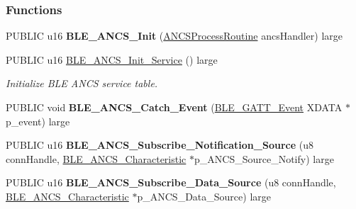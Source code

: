\subsubsection*{Functions}
\begin{DoxyCompactItemize}
\item 
P\+U\+B\+L\+IC u16 {\bfseries B\+L\+E\+\_\+\+A\+N\+C\+S\+\_\+\+Init} (\hyperlink{group___b_l_e___a_n_c_s_ga191b977bd0c8b7328a6a1c5ef65c76b2}{A\+N\+C\+S\+Process\+Routine} ancs\+Handler) large\hypertarget{group___b_l_e___a_n_c_s_ga33798ac497e1eac00ca6003700363918}{}\label{group___b_l_e___a_n_c_s_ga33798ac497e1eac00ca6003700363918}

\item 
P\+U\+B\+L\+IC u16 \hyperlink{group___b_l_e___a_n_c_s_ga517aae2875ac0c7e974484bc1a8bc64d}{B\+L\+E\+\_\+\+A\+N\+C\+S\+\_\+\+Init\+\_\+\+Service} () large
\begin{DoxyCompactList}\small\item\em Initialize B\+LE A\+N\+CS service table. \end{DoxyCompactList}\item 
P\+U\+B\+L\+IC void {\bfseries B\+L\+E\+\_\+\+A\+N\+C\+S\+\_\+\+Catch\+\_\+\+Event} (\hyperlink{struct_b_l_e___g_a_t_t___event}{B\+L\+E\+\_\+\+G\+A\+T\+T\+\_\+\+Event} X\+D\+A\+TA $\ast$p\+\_\+event) large\hypertarget{group___b_l_e___a_n_c_s_ga0b1d160545932a195913a8fab468080c}{}\label{group___b_l_e___a_n_c_s_ga0b1d160545932a195913a8fab468080c}

\item 
P\+U\+B\+L\+IC u16 {\bfseries B\+L\+E\+\_\+\+A\+N\+C\+S\+\_\+\+Subscribe\+\_\+\+Notification\+\_\+\+Source} (u8 conn\+Handle, \hyperlink{struct_b_l_e___a_n_c_s___characteristic}{B\+L\+E\+\_\+\+A\+N\+C\+S\+\_\+\+Characteristic} $\ast$p\+\_\+\+A\+N\+C\+S\+\_\+\+Source\+\_\+\+Notify) large\hypertarget{group___b_l_e___a_n_c_s_ga007adcbc32137c04f2c2516c4ecdfa9c}{}\label{group___b_l_e___a_n_c_s_ga007adcbc32137c04f2c2516c4ecdfa9c}

\item 
P\+U\+B\+L\+IC u16 {\bfseries B\+L\+E\+\_\+\+A\+N\+C\+S\+\_\+\+Subscribe\+\_\+\+Data\+\_\+\+Source} (u8 conn\+Handle, \hyperlink{struct_b_l_e___a_n_c_s___characteristic}{B\+L\+E\+\_\+\+A\+N\+C\+S\+\_\+\+Characteristic} $\ast$p\+\_\+\+A\+N\+C\+S\+\_\+\+Data\+\_\+\+Source) large\hypertarget{group___b_l_e___a_n_c_s_gaf2e829dd68a0324117d7eeabe3c87933}{}\label{group___b_l_e___a_n_c_s_gaf2e829dd68a0324117d7eeabe3c87933}

\end{DoxyCompactItemize}


